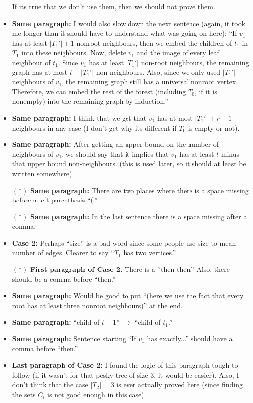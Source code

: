\documentclass[11 pt]{article}
\theoremstyle{definition}
\theoremstyle{case}
\numberwithin{equation}{section}
\begin{document}
\begin{itemize}
\begin{itemize}
\end{itemize}
If its true that we don't use them, then we should not prove them. 
\item \textbf{Same paragraph:} I would also slow down the next sentence (again, it took me longer than it should have to understand what was going on here): ``If $v_1$ has at least $|T_1'|+1$ nonroot neighbours, then we embed the children of $t_1$ in $T_1$ into these neighbours. Now, delete $v_1$ and the image of every leaf neighbour of $t_1$. Since $v_1$ has at least $|T_1'|$ non-root neighbours, the remaining graph has at most $t-|T_1'|$ non-neighbours. Also, since we only used $|T_1'|$ neighbours of $v_1$, the remaining graph still has a universal nonroot vertex. Therefore, we can embed the rest of the forest (including $T_0$, if it is nonempty) into the remaining graph by induction.''
\item \textbf{Same paragraph:} I think that we get that $v_1$ has at most $|T_1'|+r-1$ neighbours in any case (I don't get why its different if $T_0$ is empty or not). 
\item \textbf{Same paragraph:} After getting an upper bound on the number of neighbours of $v_1$, we should say that it implies that $v_1$ has at least $t$ minus that upper bound non-neighbours. (this is used later, so it should at least be written somewhere)
\item[$\boldsymbol{(*)}$] \textbf{Same paragraph:} There are two places where there is a space missing before a left parenthesis ``(.''
\item[$\boldsymbol{(*)}$] \textbf{Same paragraph:} In the last sentence there is a space missing after a comma. 
\item \textbf{Case 2:} Perhaps ``size'' is a bad word since some people use size to mean number of edges. Clearer to say ``$T_1$ has two vertices.''
\item[$\boldsymbol{(*)}$] \textbf{First paragraph of Case 2:} There is a ``then then.'' Also, there should be a comma before ``then.''
\item \textbf{Same paragraph:} Would be good to put ``(here we use the fact that every root has at least three nonroot neighbours)'' at the end.
\item \textbf{Same paragraph:} ``child of $t-1$'' $\to$ ``child of $t_1$.''
\item \textbf{Same paragraph:} Sentence starting ``If $v_1$ has exactly...'' should have a comma before ``then.''
\item \textbf{Last paragraph of Case 2:} I found the logic of this paragraph tough to follow (if it wasn't for that pesky tree of size 3, it would be easier). Also, I don't think that the case $|T_2|=3$ is ever actually proved here (since finding the sets $C_i$ is not good enough in this case). 


\end{itemize}
\end{document}
